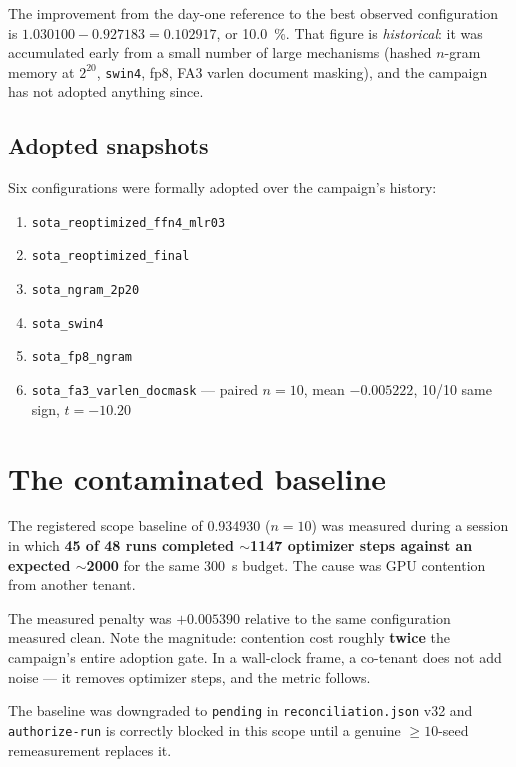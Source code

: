 \documentclass[11pt,a4paper]{article}
\begin{document}
The improvement from the day-one reference to the best observed configuration is
$1.030100 - 0.927183 = \num{0.102917}$, or \SI{10.0}{\percent}. That figure is
\emph{historical}: it was accumulated early from a small number of large mechanisms
(hashed $n$-gram memory at $2^{20}$, \texttt{swin4}, fp8, FA3 varlen document masking), and
the campaign has not adopted anything since.

\subsection{Adopted snapshots}

Six configurations were formally adopted over the campaign's history:

\begin{enumerate}[nosep,leftmargin=*]
  \item \texttt{sota\_reoptimized\_ffn4\_mlr03}
  \item \texttt{sota\_reoptimized\_final}
  \item \texttt{sota\_ngram\_2p20}
  \item \texttt{sota\_swin4}
  \item \texttt{sota\_fp8\_ngram}
  \item \texttt{sota\_fa3\_varlen\_docmask} --- paired $n=10$, mean $-0.005222$,
        10/10 same sign, $t=-10.20$
\end{enumerate}

\section{The contaminated baseline}
\label{sec:contamination}

The registered scope baseline of \num{0.934930} ($n=10$) was measured during a session in
which \textbf{45 of 48 runs completed $\sim$1147 optimizer steps against an expected
$\sim$2000} for the same \SI{300}{\second} budget. The cause was GPU contention from another
tenant.

The measured penalty was $+\num{0.005390}$ relative to the same configuration measured
clean. Note the magnitude: contention cost roughly \textbf{twice} the campaign's entire
adoption gate. In a wall-clock frame, a co-tenant does not add noise --- it removes
optimizer steps, and the metric follows.

The baseline was downgraded to \texttt{pending} in \texttt{reconciliation.json} v32 and
\texttt{authorize-run} is correctly blocked in this scope until a genuine
$\geq\!10$-seed remeasurement replaces it.
\end{document}
